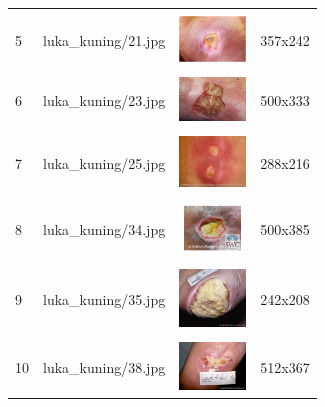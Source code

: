\begin{table}[H]
\begin{tabular}{|m{0.2in}|m{1.2in}|m{0.7in}|m{0.7in}|}
		& &  &  \\
		5& 
		luka\_kuning/21.jpg &
		\includegraphics[width=0.7in]{gambar/dataset_citra/luka_kuning/21.jpg}&
		357x242\\
		\hline
		
		& &  &  \\
		6& 
		luka\_kuning/23.jpg &
		\includegraphics[width=0.7in]{gambar/dataset_citra/luka_kuning/23.jpg}&
		500x333\\
		\hline
		
		& &  &  \\
		7& 
		luka\_kuning/25.jpg &
		\includegraphics[width=0.7in]{gambar/dataset_citra/luka_kuning/25.jpg}&
		288x216\\
		\hline
				
		& &  &  \\
		8 & 
		luka\_kuning/34.jpg &
		\includegraphics[width=0.7in]{gambar/dataset_citra/luka_kuning/34.jpg}&
		500x385\\
		\hline
		
		& &  &  \\
		9& 
		luka\_kuning/35.jpg &
		\includegraphics[width=0.7in]{gambar/dataset_citra/luka_kuning/35.jpg}&
		242x208\\
		\hline
		
		& &  &  \\
		10& 
		luka\_kuning/38.jpg &
		\includegraphics[width=0.7in]{gambar/dataset_citra/luka_kuning/38.jpg}&
		512x367\\
		\hline

	\end{tabular}
\end{table}

